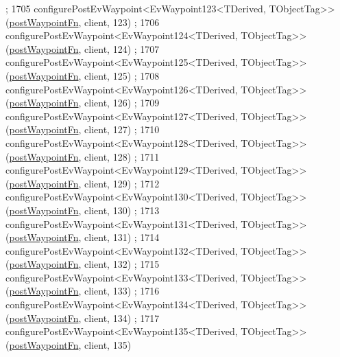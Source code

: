 \begin{DoxyCode}
      ;
1705     configurePostEvWaypoint<EvWaypoint123<TDerived, TObjectTag>>(\hyperlink{classmove__base__z__client_1_1WaypointEventDispatcher_acc538eb7506c13f7cca2268a1742dadd}{postWaypointFn}, client, 123)
      ;
1706     configurePostEvWaypoint<EvWaypoint124<TDerived, TObjectTag>>(\hyperlink{classmove__base__z__client_1_1WaypointEventDispatcher_acc538eb7506c13f7cca2268a1742dadd}{postWaypointFn}, client, 124)
      ;
1707     configurePostEvWaypoint<EvWaypoint125<TDerived, TObjectTag>>(\hyperlink{classmove__base__z__client_1_1WaypointEventDispatcher_acc538eb7506c13f7cca2268a1742dadd}{postWaypointFn}, client, 125)
      ;
1708     configurePostEvWaypoint<EvWaypoint126<TDerived, TObjectTag>>(\hyperlink{classmove__base__z__client_1_1WaypointEventDispatcher_acc538eb7506c13f7cca2268a1742dadd}{postWaypointFn}, client, 126)
      ;
1709     configurePostEvWaypoint<EvWaypoint127<TDerived, TObjectTag>>(\hyperlink{classmove__base__z__client_1_1WaypointEventDispatcher_acc538eb7506c13f7cca2268a1742dadd}{postWaypointFn}, client, 127)
      ;
1710     configurePostEvWaypoint<EvWaypoint128<TDerived, TObjectTag>>(\hyperlink{classmove__base__z__client_1_1WaypointEventDispatcher_acc538eb7506c13f7cca2268a1742dadd}{postWaypointFn}, client, 128)
      ;
1711     configurePostEvWaypoint<EvWaypoint129<TDerived, TObjectTag>>(\hyperlink{classmove__base__z__client_1_1WaypointEventDispatcher_acc538eb7506c13f7cca2268a1742dadd}{postWaypointFn}, client, 129)
      ;
1712     configurePostEvWaypoint<EvWaypoint130<TDerived, TObjectTag>>(\hyperlink{classmove__base__z__client_1_1WaypointEventDispatcher_acc538eb7506c13f7cca2268a1742dadd}{postWaypointFn}, client, 130)
      ;
1713     configurePostEvWaypoint<EvWaypoint131<TDerived, TObjectTag>>(\hyperlink{classmove__base__z__client_1_1WaypointEventDispatcher_acc538eb7506c13f7cca2268a1742dadd}{postWaypointFn}, client, 131)
      ;
1714     configurePostEvWaypoint<EvWaypoint132<TDerived, TObjectTag>>(\hyperlink{classmove__base__z__client_1_1WaypointEventDispatcher_acc538eb7506c13f7cca2268a1742dadd}{postWaypointFn}, client, 132)
      ;
1715     configurePostEvWaypoint<EvWaypoint133<TDerived, TObjectTag>>(\hyperlink{classmove__base__z__client_1_1WaypointEventDispatcher_acc538eb7506c13f7cca2268a1742dadd}{postWaypointFn}, client, 133)
      ;
1716     configurePostEvWaypoint<EvWaypoint134<TDerived, TObjectTag>>(\hyperlink{classmove__base__z__client_1_1WaypointEventDispatcher_acc538eb7506c13f7cca2268a1742dadd}{postWaypointFn}, client, 134)
      ;
1717     configurePostEvWaypoint<EvWaypoint135<TDerived, TObjectTag>>(\hyperlink{classmove__base__z__client_1_1WaypointEventDispatcher_acc538eb7506c13f7cca2268a1742dadd}{postWaypointFn}, client, 135)

\end{DoxyCode}
